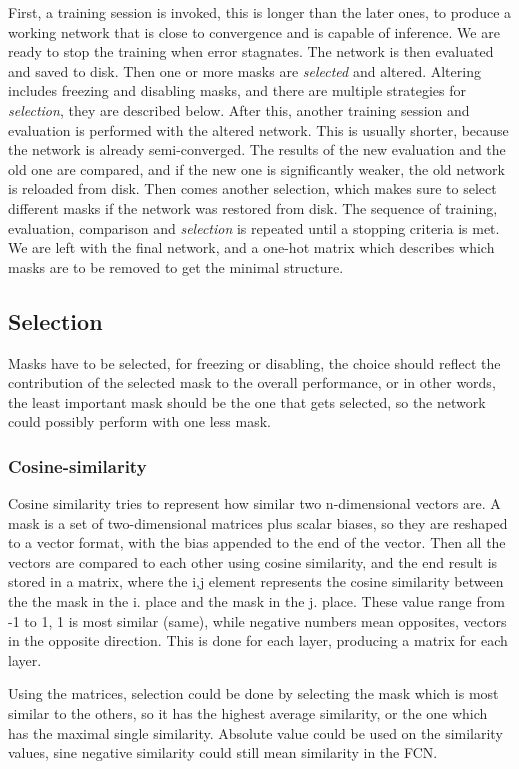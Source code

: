 \documentclass[12pt]{report}
\begin{document}
First, a training session is invoked, this is longer than the later ones, to produce a working network that is close to convergence and is capable of inference. We are ready to stop the training when error stagnates. The network is then evaluated and saved to disk. Then one or more masks are \textit{selected} and altered. Altering includes freezing and disabling masks, and there are multiple strategies for \textit{selection}, they are described below. After this, another training session and evaluation is performed with the altered network. This is usually shorter, because the network is already semi-converged. The results of the new evaluation and the old one are compared, and if the new one is significantly weaker, the old network is reloaded from disk. Then comes another selection, which makes sure to select different masks if the network was restored from disk. The sequence of training, evaluation, comparison and \textit{selection} is repeated until a stopping criteria is met. We are left with the final network, and a one-hot matrix which describes which masks are to be removed to get the minimal structure.
\subsection{Selection}
Masks have to be selected, for freezing or disabling, the choice should reflect the contribution of the selected mask to the overall performance, or in other words, the least important mask should be the one that gets selected, so the network could possibly perform with one less mask.
\subsubsection{Cosine-similarity}Cosine similarity  tries to represent how similar two n-dimensional vectors are. A mask is a set of two-dimensional matrices plus scalar biases, so they are reshaped to a vector format, with the bias appended to the end of the vector. Then all the vectors are compared to each other using cosine similarity, and the end result is stored in a matrix, where the i,j element represents the cosine similarity between the the mask in the i. place and the mask in the j. place. These value range from -1 to 1, 1 is most similar (same), while negative numbers mean opposites, vectors in the opposite direction. This is done for each layer, producing a matrix for each layer.

Using the matrices, selection could be done by selecting the mask which is most similar to the others, so it has the highest average similarity, or the one which has the maximal single similarity. Absolute value could be used on the similarity values, sine negative similarity could still mean similarity in the FCN.
\end{document}
